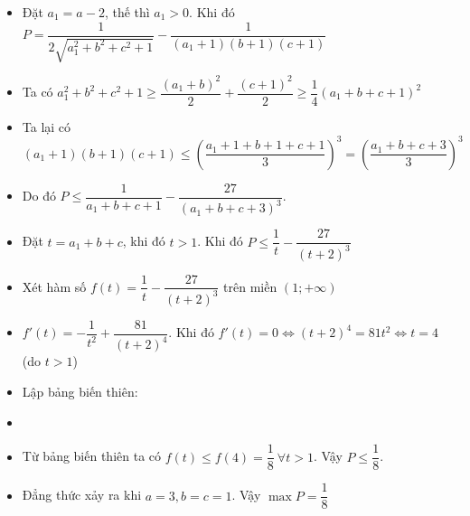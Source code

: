 \lgi 
\begin{itemize}[label=,leftmargin=*]
\item Đặt $a_1=a-2$, thế thì $a_1>0$. Khi đó $P=\dfrac{1}{2\sqrt{a_1^2+b^2+c^2+1}}-\dfrac{1}{(a_1+1)(b+1)(c+1)}$
\item Ta có $a_1^2+b^2+c^2+1 \ge \dfrac{(a_1+b)^2}{2}+\dfrac{(c+1)^2}{2}\ge \dfrac{1}{4}(a_1+b+c+1)^2$
\item Ta lại có $(a_1+1)(b+1)(c+1)\le \left(\dfrac{a_1+1+b+1+c+1}{3} \right)^3=\left(\dfrac{a_1+b+c+3}{3} \right)^3$
\item Do đó $P\le \dfrac{1}{a_1+b+c+1}-\dfrac{27}{(a_1+b+c+3)^3}$.
\item Đặt $t=a_1+b+c$, khi đó $t>1$. Khi đó $P\le \dfrac{1}{t}-\dfrac{27}{(t+2)^3}$
\item Xét hàm số $f(t)=\dfrac{1}{t}-\dfrac{27}{(t+2)^3}$ trên miền $(1;+\infty)$
\item $f'(t)=-\dfrac{1}{t^2}+\dfrac{81}{(t+2)^4}$. Khi đó $f'(t)=0 \Leftrightarrow (t+2)^4=81t^2\Leftrightarrow t=4$ (do $t>1$)
\item Lập bảng biến thiên:
\item {}
\item Từ bảng biến thiên ta có $f(t)\le f(4)=\dfrac{1}{8} \ \forall t > 1$. Vậy $P\le \dfrac{1}{8}$.
\item Đẳng thức xảy ra khi $a=3,b=c=1$. Vậy $\max P=\dfrac{1}{8}$
\end{itemize}

